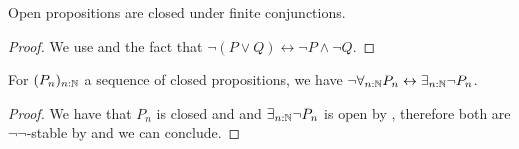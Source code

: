 \begin{corollary}\label{OpenFiniteConjunction}
Open propositions are closed under finite conjunctions. 
\end{corollary}
\begin{proof}
We use  and the fact that $\neg(P\lor Q) \leftrightarrow \neg P \land \neg Q$.
\end{proof}

\begin{lemma}\label{ClosedMarkov}
  For $(P_n)_{n:\mathbb{N}}$ a sequence of closed propositions, we have 
  $\neg \forall_{n:\mathbb{N}} P_n \leftrightarrow  \exists_{n:\mathbb{N}} \neg P_n$. 
\end{lemma}
\begin{proof}
We have that $P_n$ is closed and and $\exists_{n:\mathbb{N}} \neg P_n$ is open by , therefore both are $\neg\neg$-stable by  and we can conclude.
\end{proof} 

